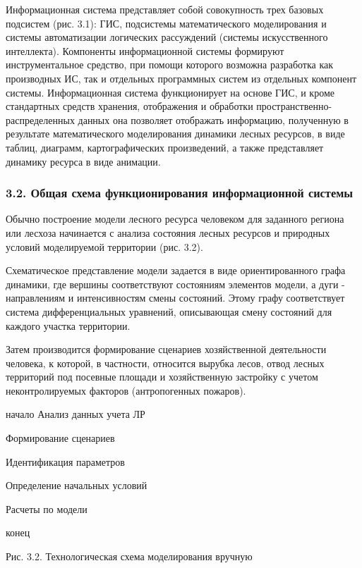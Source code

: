 \documentclass{article}
\begin{document}
Информационная система представляет собой 
совокупность трех базовых подсистем (рис. 3.1): 
ГИС, подсистемы математического моделирования 
и системы автоматизации логических рассуждений 
(системы искусственного интеллекта). Компоненты 
информационной системы формируют инструментальное 
средство, при помощи которого возможна разработка 
как производных  ИС, так и отдельных программных 
систем из отдельных компонент системы. Информационная 
система функционирует на основе ГИС, и кроме 
стандартных средств хранения, отображения 
и обработки пространственно-распределенных 
данных она позволяет отображать информацию, 
полученную в результате математического моделирования 
динамики лесных ресурсов, в виде таблиц, диаграмм, 
картографических произведений, а также представляет 
динамику ресурса в виде анимации.\label{HToc128995780}\label{HToc199746726}

\subsubsection*{\textbf{3.2. Общая схема функционирования 
информационной системы}}

Обычно \label{OLEHLINK16}\label{OLEHLINK17}построение модели 
лесного ресурса человеком для заданного региона 
или лесхоза начинается с анализа состояния 
лесных ресурсов и природных условий моделируемой 
территории (рис. 3.2). 

Схематическое представление модели задается 
в виде ориентированного графа динамики, где 
вершины соответствуют состояниям элементов 
модели, а дуги - направлениям и интенсивностям 
смены состояний. Этому графу соответствует 
система дифференциальных уравнений, описывающая 
смену состояний для каждого участка территории.

Затем производится формирование сценариев 
хозяйственной деятельности человека, к которой, 
в частности, относится вырубка лесов, отвод 
лесных территорий под посевные площади и хозяйственную 
застройку с учетом неконтролируемых факторов 
(антропогенных пожаров). 

\begin{center}
начало
Анализ данных учета ЛР

Формирование сценариев

Идентификация параметров

Определение начальных условий

Расчеты по модели

конец\fancyfoot[LE]{\thepage{}}
\fancyfoot[LO]{\thepage{}}

Рис. 3.2. Технологическая схема моделирования 
вручную 
\end{center}
\end{document}
